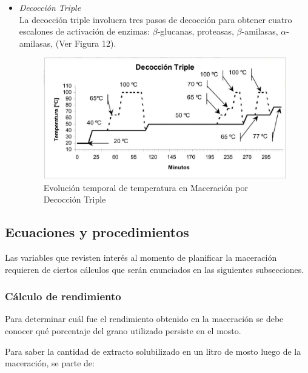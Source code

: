 \begin{itemize}
                    \item \textit{Decocción Triple} \\ La decocción triple involucra tres pasos de decocción para obtener cuatro escalones de activación de enzimas: $\beta$-glucanas, proteasas, $\beta$-amilasas, $\alpha$-amilasas, (Ver Figura 12).
                    
                        \begin{figure} [H]		                                                            \centerline{\includegraphics[scale=0.5]{decoccion_triple.jpg}}
                        \caption{Evolución temporal de temperatura en Maceración por Decocción Triple}
                        \label{MaceracionDecoccionTriple}
                        \end{figure}
                    
                \end{itemize}
        \subsection{Ecuaciones y procedimientos}
            \par Las variables que revisten interés al momento de planificar la maceración requieren de ciertos cálculos que serán enunciados en las siguientes subsecciones. 
            
            \subsubsection{Cálculo de rendimiento }
                \par Para determinar cuál fue el rendimiento obtenido en la maceración se debe conocer qué porcentaje del grano utilizado persiste en el mosto.
                
                Para saber la cantidad de extracto solubilizado en un litro de mosto luego de la maceración, se parte de:
                    
